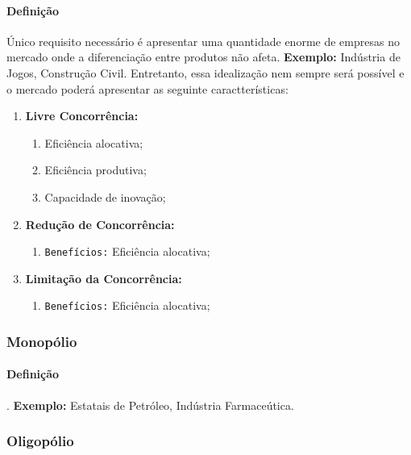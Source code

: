 \documentclass{article}
\begin{document}
            \paragraph{Definição}Único requisito necessário é apresentar uma quantidade enorme de empresas no mercado onde a diferenciação entre produtos não afeta. \textbf{Exemplo:} Indústria de Jogos, Construção Civil. Entretanto, essa idealização nem sempre será possível e o mercado poderá apresentar as seguinte caractterísticas:
                \begin{enumerate}
                    \item \textbf{Livre Concorrência:}
                        \begin{enumerate}
                            \item Eficiência alocativa;
                            \item Eficiência produtiva;
                            \item Capacidade de inovação;
                        \end{enumerate}

                    \item \textbf{Redução de Concorrência:}
                        \begin{enumerate}
                            \item \texttt{Benefícios:} Eficiência alocativa;
                        \end{enumerate}

                    \item \textbf{Limitação da Concorrência:}
                        \begin{enumerate}
                            \item \texttt{Benefícios:} Eficiência alocativa;
                        \end{enumerate}
                \end{enumerate}

        \subsubsection{Monopólio}
            \paragraph{Definição}. \textbf{Exemplo:} Estatais de Petróleo, Indústria Farmaceútica.

        \subsubsection{Oligopólio}
\end{document}
